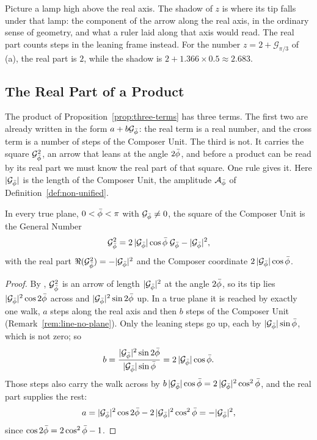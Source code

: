 \begin{plainwords}
Picture a lamp high above the real axis. The shadow of $z$ is where its tip falls under that lamp: the component of the arrow along the real axis, in the ordinary sense of geometry, and what a ruler laid along that axis would read. The real part counts steps in the leaning frame instead. For the number $z = 2 + \mathcal{G}_{\pi/3}$ of (a), the real part is $2$, while the shadow is $2 + 1.366 \times 0.5 \approx 2.683$.
\end{plainwords}

\subsection{The Real Part of a Product}\label{subsec:gn-real-product}

The product of Proposition~\ref{prop:three-terms} has three terms. The first two are already written in the form $a + b\mathcal{G}_{\bar{\phi}}$: the real term is a real number, and the cross term is a number of steps of the Composer Unit. The third is not. It carries the square $\mathcal{G}_{\bar{\phi}}^2$, an arrow that leans at the angle $2\bar{\phi}$, and before a product can be read by its real part we must know the real part of that square. One rule gives it. Here $|\mathcal{G}_{\bar{\phi}}|$ is the length of the Composer Unit, the amplitude $\mathcal{A}_{\bar{\phi}}$ of Definition~\ref{def:non-unified}.

\begin{proposition}\label{prop:square-rule}
In every true plane, $0 < \bar{\phi} < \pi$ with $\mathcal{G}_{\bar{\phi}} \neq 0$, the square of the Composer Unit is the General Number
\[
\mathcal{G}_{\bar{\phi}}^2 = 2\,|\mathcal{G}_{\bar{\phi}}|\cos\bar{\phi}\;\mathcal{G}_{\bar{\phi}} - |\mathcal{G}_{\bar{\phi}}|^2 ,
\]
with the real part $\Re(\mathcal{G}_{\bar{\phi}}^2) = -|\mathcal{G}_{\bar{\phi}}|^2$ and the Composer coordinate $2\,|\mathcal{G}_{\bar{\phi}}|\cos\bar{\phi}$.
\end{proposition}

\begin{proof}
By , $\mathcal{G}_{\bar{\phi}}^2$ is an arrow of length $|\mathcal{G}_{\bar{\phi}}|^2$ at the angle $2\bar{\phi}$, so its tip lies $|\mathcal{G}_{\bar{\phi}}|^2\cos 2\bar{\phi}$ across and $|\mathcal{G}_{\bar{\phi}}|^2\sin 2\bar{\phi}$ up. In a true plane it is reached by exactly one walk, $a$ steps along the real axis and then $b$ steps of the Composer Unit (Remark~\ref{rem:line-no-plane}). Only the leaning steps go up, each by $|\mathcal{G}_{\bar{\phi}}|\sin\bar{\phi}$, which is not zero; so
\[
b = \frac{|\mathcal{G}_{\bar{\phi}}|^2\sin 2\bar{\phi}}{|\mathcal{G}_{\bar{\phi}}|\sin\bar{\phi}} = 2\,|\mathcal{G}_{\bar{\phi}}|\cos\bar{\phi} .
\]
Those steps also carry the walk across by $b\,|\mathcal{G}_{\bar{\phi}}|\cos\bar{\phi} = 2\,|\mathcal{G}_{\bar{\phi}}|^2\cos^2\bar{\phi}$, and the real part supplies the rest:
\[
a = |\mathcal{G}_{\bar{\phi}}|^2\cos 2\bar{\phi} - 2\,|\mathcal{G}_{\bar{\phi}}|^2\cos^2\bar{\phi} = -|\mathcal{G}_{\bar{\phi}}|^2 ,
\]
since $\cos 2\bar{\phi} = 2\cos^2\bar{\phi} - 1$.
\end{proof}

